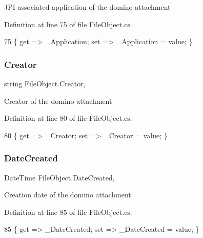 J\+PI associated application of the domino attachment 



Definition at line 75 of file File\+Object.\+cs.


\begin{DoxyCode}
75 \{ \textcolor{keyword}{get} => \_Application; \textcolor{keyword}{set} => \_Application = value; \}
\end{DoxyCode}
\mbox{\label{class_file_object_a1ab7d29c80841b60b276b7430f4e5ec7}} 
\subsubsection{\texorpdfstring{Creator}{Creator}}
{\footnotesize\ttfamily string File\+Object.\+Creator\hspace{0.3cm}{\ttfamily [get]}, {\ttfamily [set]}}



Creator of the domino attachment 



Definition at line 80 of file File\+Object.\+cs.


\begin{DoxyCode}
80 \{ \textcolor{keyword}{get} => \_Creator; \textcolor{keyword}{set} => \_Creator = value; \}
\end{DoxyCode}
\mbox{\label{class_file_object_a372b9a7dad068368526b0698550f9504}} 
\subsubsection{\texorpdfstring{Date\+Created}{DateCreated}}
{\footnotesize\ttfamily Date\+Time File\+Object.\+Date\+Created\hspace{0.3cm}{\ttfamily [get]}, {\ttfamily [set]}}



Creation date of the domino attachment 



Definition at line 85 of file File\+Object.\+cs.


\begin{DoxyCode}
85 \{ \textcolor{keyword}{get} => \_DateCreated; \textcolor{keyword}{set} => \_DateCreated = value; \}
\end{DoxyCode}
\mbox{\label{class_file_object_a9a4c52e205bee3f8bdfa7040f465b6af}} 
